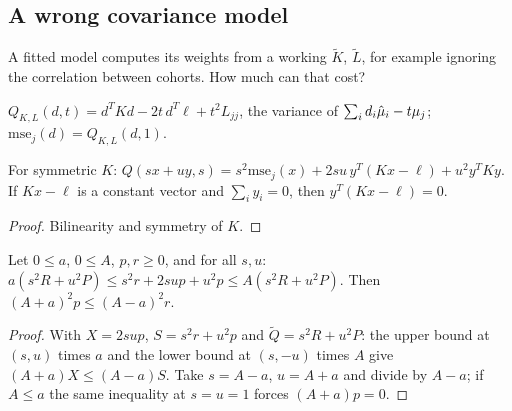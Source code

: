 \subsection*{A wrong covariance model}

A fitted model computes its weights from a working $\tilde K$, $\tilde L$, for
example ignoring the correlation between cohorts. How much can that cost?

\begin{definition}\label{def:Core_predForm}
  \leanok
  $Q_{K,L}(d,t) = d^TKd - 2t\,d^T\ell + t^2L_{jj}$, the variance of
  $\sum_i d_i\hat\mu_i - t\mu_j$; $\mathrm{mse}_j(d) = Q_{K,L}(d,1)$.
\end{definition}

\begin{lemma}\label{lem:Core_predForm}
  \leanok
  For symmetric $K$:
  $Q(sx + uy, s) = s^2\mathrm{mse}_j(x) + 2su\,y^T(Kx - \ell) + u^2y^TKy$. If
  $Kx - \ell$ is a constant vector and $\sum_i y_i = 0$, then $y^T(Kx - \ell) = 0$.
\end{lemma}
\begin{proof}
  \leanok
  Bilinearity and symmetry of $K$.
\end{proof}

\begin{lemma}\label{lem:wielandt}
  \leanok
  Let $0 \le a$, $0 \le A$, $p, r \ge 0$, and for all $s, u$:
  $a(s^2R + u^2P) \le s^2r + 2sup + u^2p \le A(s^2R + u^2P)$. Then
  $(A+a)^2p \le (A-a)^2r$.
\end{lemma}
\begin{proof}
  \leanok
  With $X = 2sup$, $S = s^2r + u^2p$ and $\tilde Q = s^2R + u^2P$: the upper bound at
  $(s,u)$ times $a$ and the lower bound at $(s,-u)$ times $A$ give
  $(A+a)X \le (A-a)S$. Take $s = A - a$, $u = A + a$ and divide by $A - a$; if
  $A \le a$ the same inequality at $s = u = 1$ forces $(A+a)p = 0$.
\end{proof}

